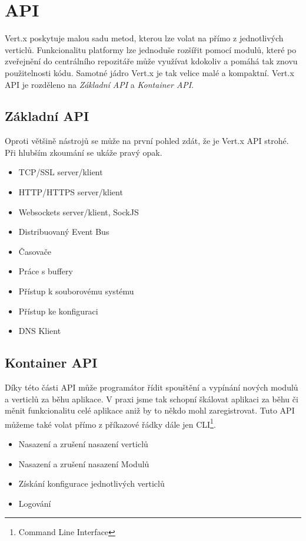 \section{API}\label{sub:API}

Vert.x poskytuje malou sadu metod, kterou lze volat na přímo z jednotlivých verticlů.
Funkcionalitu platformy lze jednoduše rozšířit pomocí modulů, které po zveřejnění do centrálního repozitáře může využívat kdokoliv a pomáhá tak znovu použitelnosti kódu. Samotné jádro Vert.x je tak velice malé a kompaktní. Vert.x API je rozděleno na \emph{Základní API} a \emph{Kontainer API}.

\subsection{Základní API}\label{sub:coreAPI}

Oproti většině nástrojů se může na první pohled zdát, že je Vert.x API strohé. Při hlubším zkoumání se ukáže pravý opak.

\begin{itemize}
\item{TCP/SSL server/klient}
\item{HTTP/HTTPS server/klient}
\item{Websockets server/klient, SockJS}
\item{Distribuovaný Event Bus}
\item{Časovače}
\item{Práce s buffery}
\item{Přístup k souborovému systému}
\item{Přístup ke konfiguraci}
\item{DNS Klient}
\end{itemize}

\subsection{Kontainer API}

Díky této části API může programátor řídit spouštění a vypínání nových modulů a verticlů za běhu aplikace. V praxi jsme tak schopní škálovat aplikaci za běhu či měnit funkcionalitu celé aplikace aniž by to někdo mohl zaregistrovat. Tuto API můžeme také volat přímo z příkazové řádky dále jen CLI\footnote{Command Line Interface}.

\begin{itemize}
\item{Nasazení a zrušení nasazení verticlů}
\item{Nasazení a zrušení nasazení Modulů}
\item{Získání konfigurace jednotlivých verticlů}
\item{Logování}
\end{itemize}

